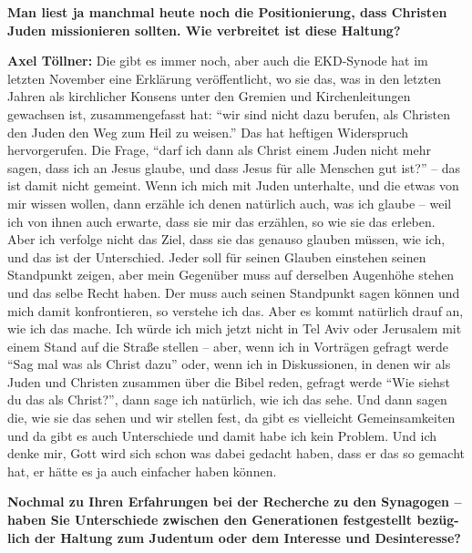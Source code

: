 \textbf{Man liest ja manchmal heute noch die Positionierung, dass Christen Juden missionieren sollten. Wie verbreitet ist diese Haltung?} 

\textbf{Axel Töllner:} Die gibt es immer noch, aber auch die EKD-Synode hat im letzten November eine Erklärung veröffentlicht, wo sie das, was in den letzten Jahren als kirchlicher Konsens unter den Gremien und Kirchenleitungen gewachsen ist, zusammengefasst hat: "`wir sind nicht dazu berufen, als Christen den Juden den Weg zum Heil zu weisen."' Das hat heftigen Widerspruch hervorgerufen. Die Frage, "`darf ich dann als Christ einem Juden nicht mehr sagen, dass ich an Jesus glaube, und dass Jesus für alle Menschen gut ist?"' – das ist damit nicht gemeint. Wenn ich mich mit Juden unterhalte, und die etwas von mir wissen wollen, dann erzähle ich denen natürlich auch, was ich glaube – weil ich von ihnen auch erwarte, dass sie mir das erzählen, so wie sie das erleben. Aber ich verfolge nicht das Ziel, dass sie das genauso glauben müssen, wie ich, und das ist der Unterschied. Jeder soll für seinen Glauben einstehen seinen Standpunkt zeigen, aber mein Gegenüber muss auf derselben Augenhöhe stehen und das selbe Recht haben. Der muss auch seinen Standpunkt sagen können und mich damit konfrontieren, so verstehe ich das.  
Aber es kommt natürlich drauf an, wie ich das mache. Ich würde ich mich jetzt nicht in Tel Aviv oder Jerusalem mit einem Stand auf die Straße stellen – aber, wenn ich in Vorträgen gefragt werde "`Sag mal was als Christ dazu"' oder, wenn ich in Diskussionen, in denen wir als Juden und Christen zusammen über die Bibel reden, gefragt werde "`Wie siehst du das als Christ?"', dann sage ich natürlich, wie ich das sehe. Und dann sagen die, wie sie das sehen und wir stellen fest, da gibt es vielleicht Gemeinsamkeiten und da gibt es auch Unterschiede und damit habe ich kein Problem. Und ich denke mir, Gott wird sich schon was dabei gedacht haben, dass er das so gemacht hat, er hätte es ja auch einfacher haben können.  

\textbf{Nochmal zu Ihren Erfahrungen bei der Recherche zu den Synagogen – haben Sie Unterschiede zwischen den Generationen festgestellt bezüg-lich der Haltung zum Judentum oder dem Interesse und Desinteresse?} 
 
